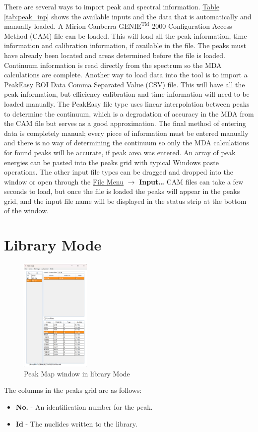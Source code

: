\documentclass[12pt,report,justified]{SANDreport}
\begin{document}
There are several ways to import peak and spectral information.
\hyperref[tab:peak_inp]{Table \ref{tab:peak_inp}} shows the available inputs and
the data that is automatically and manually loaded. A Mirion Canberra \(\text{GENIE}^{\text{TM}}\) 2000
Configuration Access Method (CAM) file can be loaded. This will load all the peak information, time
information and calibration information, if available in the file. The peaks must have already been located
and areas determined before the file is loaded. Continuum information is read directly from the spectrum so
the MDA calculations are complete. Another way to load data into the tool is to import a PeakEasy ROI Data
Comma Separated Value (CSV) file. This will have all the peak information, but efficiency calibration and time
information will need to be loaded manually. The PeakEasy file type uses linear interpolation between peaks to
determine the continuum, which is a degradation of accuracy in the MDA from the CAM file but serves as a
good approximation. The final method of entering data is completely manual; every piece of information must be
entered manually and there is no way of determining the continuum so only the MDA calculations for found peaks
will be accurate, if peak area was entered. An array of peak energies can be pasted into the peaks grid with
typical Windows paste operations. The other input file types can be dragged and dropped into the window or open
through the \hyperref[sec:file_menu]{File Menu} \(\rightarrow\) \textbf{Input\ldots} CAM files can take a few seconds
to load, but once the file is loaded the peaks will appear in the peaks grid, and the input file name will be
displayed in the status strip at the bottom of the window.

\section{Library Mode}\label{sec:lib_mode}
\begin{figure}[h]
    \includegraphics[width=0.3\textwidth]{LibraryMode.png}
    \centering
    \caption{Peak Map window in library Mode}
   \label{fig:lib_mode}
\end{figure}
The columns in the peaks grid are as follows:
\begin{itemize}
    \item \textbf{No.} - An identification number for the peak.
    \item \textbf{Id} - The nuclides written to the library.
\end{itemize}
\end{document}
